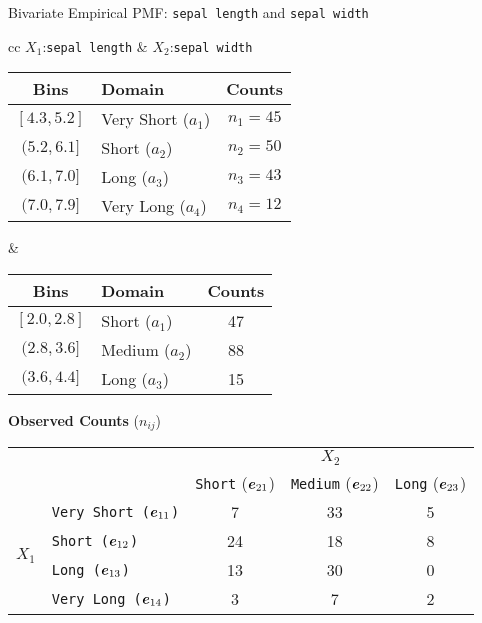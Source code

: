 \begin{frame}{Bivariate Empirical PMF: {\tt sepal length} and {\tt sepal width}}

\begin{center}
  \small
  \begin{tabular}{cc}
	$X_1$:{\tt sepal length} & $X_2$:{\tt sepal width}\\
\begin{tabular}{|c|l|c|}
        \hline
        Bins & Domain & Counts\\
        \hline
        $[4.3, 5.2]$ & Very Short ($a_1$) & $n_1 = 45$\\
        $(5.2, 6.1]$ & Short ($a_2$) & $n_2 = 50$\\
        $(6.1, 7.0]$ & Long ($a_3$)& $n_3 = 43$\\
        $(7.0, 7.9]$ & Very Long ($a_4$)& $n_4 = 12$\\
        \hline
    \end{tabular}%
  &
	\begin{tabular}{|c|l|c|}
        \hline
        Bins & Domain & Counts\\
        \hline
        $[2.0, 2.8]$ & Short ($a_1$) & 47\\
        $(2.8, 3.6]$ & Medium ($a_2$) & 88\\
        $(3.6, 4.4]$ & Long ($a_3$) & 15\\
        \hline
    \end{tabular}
  \end{tabular}
\end{center}


{\bf Observed Counts} ($\textit{n}_{\textit{ij}}$)

\centering
\begin{tabular}{|c|l||c|c|c|}
\hline
    & &\multicolumn{3}{c|}{$X_2$}\\
    \cline{3-5}
    & &{{\tt Short} (${\boldsymbol e}_{21}$)} & {{\tt Medium} (${\boldsymbol e}_{22}$)} &     {{\tt Long} (${\boldsymbol e}_{23}$)}\\
    \hline\hline
    \multirow{4}{*}{$X_1$}
    & {\tt Very Short (${\boldsymbol e}_{11}$)} &  7  & 33  & 5\\
    &{\tt Short (${\boldsymbol e}_{12}$)} & 24  &18  & 8\\
    &{\tt Long (${\boldsymbol e}_{13}$)} & 13  & 30   & 0\\
    &{\tt Very Long (${\boldsymbol e}_{14}$)} & 3  & 7   & 2\\
\hline
\end{tabular}%
\end{frame}


